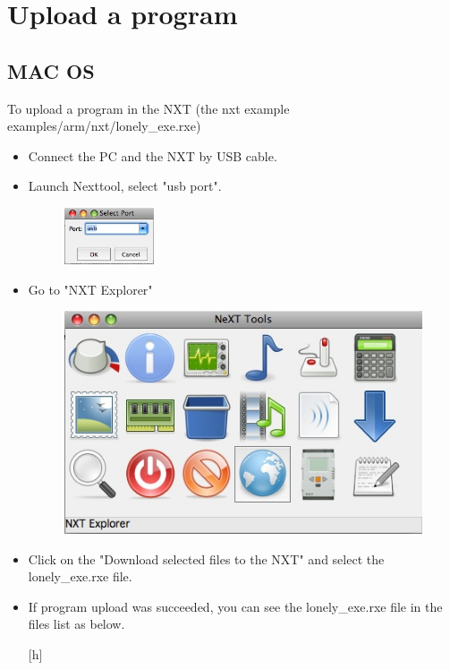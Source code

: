 \section{Upload a program} \label{uploadprogram}
\subsection{MAC OS}
To upload a program in the NXT (the nxt example examples/arm/nxt/lonely\_exe.rxe)
\begin{itemize}
\item Connect the PC and the NXT by USB cable.
\item Launch Nexttool, select "usb port".
	\begin{figure}[htbp] %
   		\centering
		\includegraphics[width=0.25\textwidth]{pictures/usbport.jpg}
	\end{figure}
\item Go to "NXT Explorer"
	\begin{figure}[htbp] %
   		\centering
		\includegraphics[width=.7\textwidth]{pictures/nxtexplorer.jpg}
	\end{figure}
\item Click on the "Download selected files to the NXT" and select the lonely\_exe.rxe file.
\item If program upload was succeeded, you can see the lonely\_exe.rxe file in the files list as below.
	\begin{center}[h] %

\end{center}
\end{itemize}
